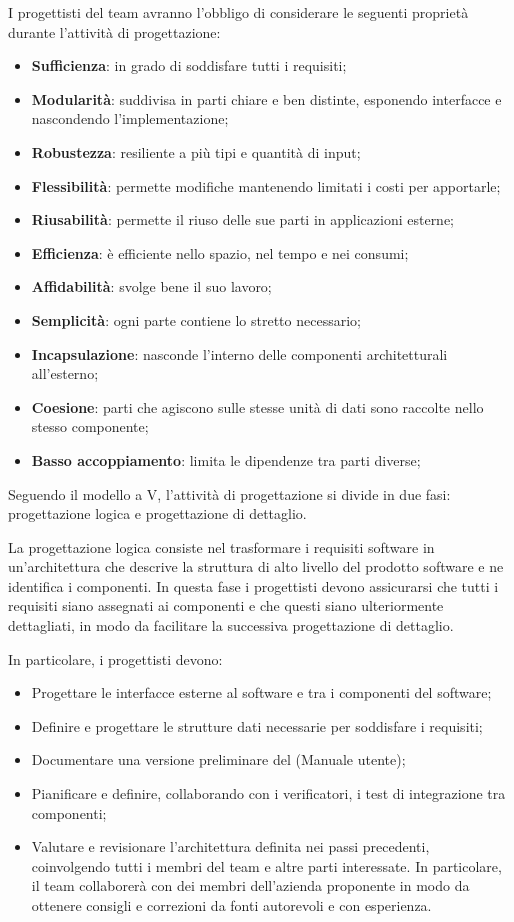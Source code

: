 \documentclass[10pt, a4paper]{article}
\begin{document}
I progettisti del team avranno l'obbligo di considerare le seguenti proprietà durante l'attività di progettazione:
\begin{itemize}
    \item \textbf{Sufficienza}: in grado di soddisfare tutti i requisiti;
    \item \textbf{Modularità}: suddivisa in parti chiare e ben distinte, esponendo interfacce e nascondendo l'implementazione;
    \item \textbf{Robustezza}: resiliente a più tipi e quantità di input;
    \item \textbf{Flessibilità}: permette modifiche mantenendo limitati i costi per apportarle;
    \item \textbf{Riusabilità}: permette il riuso delle sue parti in applicazioni esterne;
    \item \textbf{Efficienza}: è efficiente nello spazio, nel tempo e nei consumi;
    \item \textbf{Affidabilità}: svolge bene il suo lavoro;
    \item \textbf{Semplicità}: ogni parte contiene lo stretto necessario;
    \item \textbf{Incapsulazione}: nasconde l'interno delle componenti architetturali all'esterno;
    \item \textbf{Coesione}: parti che agiscono sulle stesse unità di dati sono raccolte nello stesso componente;
    \item \textbf{Basso accoppiamento}: limita le dipendenze tra parti diverse;
\end{itemize}

Seguendo il modello a V, l'attività di progettazione si divide in due fasi: progettazione logica e progettazione di dettaglio.

La progettazione logica consiste nel trasformare i requisiti software in un'architettura che descrive la struttura di alto livello del prodotto software e ne identifica i componenti.
In questa fase i progettisti devono assicurarsi che tutti i requisiti siano assegnati ai componenti e che questi siano ulteriormente dettagliati, in modo da facilitare la successiva progettazione di dettaglio.

In particolare, i progettisti devono:
\begin{itemize}
    \item Progettare le interfacce esterne al software e tra i componenti del software;
    \item Definire e progettare le strutture dati necessarie per soddisfare i requisiti;
    \item Documentare una versione preliminare del (Manuale utente);
    \item Pianificare e definire, collaborando con i verificatori, i test di integrazione tra componenti;
    \item Valutare e revisionare l'architettura definita nei passi precedenti, coinvolgendo tutti i membri del team e altre parti interessate. In particolare, il team collaborerà con dei membri dell'azienda proponente in modo da ottenere consigli e correzioni da fonti autorevoli e con esperienza.
\end{itemize}
\end{document}
